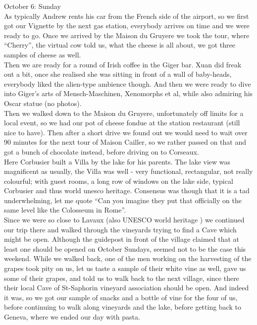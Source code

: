 October 6: Sunday\\
As typically Andrew rents his car from the French side of the airport, so we first got our Vignette by the next gas station, everybody arrives on time and we were ready to go. Once we arrived by the Maison du Gruyere we took the tour, where ``Cherry'', the virtual cow told us, what the cheese is all about, we got three samples of cheese as well. \\
Then we are ready for a round of Irish coffee in the Giger bar. Xuan did freak out a bit, once she realised she was sitting in front of a wall of baby-heads, everybody liked the alien-type ambience though. And then we were ready to dive into Giger's arts of Mensch-Maschinen, Xenomorphs et al, while also admiring his Oscar statue (no photos). \\
Then we walked down to the Maison du Gruyere, unfortunately off limits for a local event, so we had our pot of cheese fondue at the station restaurant (still nice to have). Then after a short drive we found out we would need to wait over 90 minutes for the next tour of Maison Cailler, so we rather passed on that and got a bunch of chocolate instead, before driving on to Corseaux.\\
 Here Corbusier built a Villa by the lake for his parents. The lake view was magnificent as usually, the Villa was well - very functional, rectangular, not really colourful; with guest rooms, a long row of windows on the lake side, typical Corbusier and thus world unesco heritage. Consensus was though that it is a tad underwhelming, let me quote ``Can you imagine they put that officially on the same level like the Colosseum in Rome''.\\
  Since we were so close to Lavaux (also UNESCO world heritage ) we continued our trip there and walked through the vineyards trying to find a Cave which might be open. Although the guidepost in front of the village claimed that at least one should be opened on October Sundays, seemed not to be the case this weekend. While we walked back, one of the men working on the harvesting of the grapes took pity on us, let us taste a sample of their white vine as well, gave us some of their grapes, and told us to walk back to the next village, since there their local Cave of St-Saphorin vineyard association should be open. And indeed it was, so we got our sample of snacks and a bottle of vine for the four of us, before continuing to walk along vineyards and the lake, before getting back to Geneva, where we ended our day with pasta.\\


